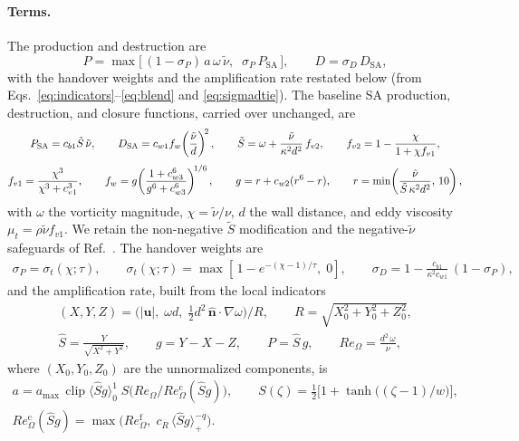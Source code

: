 \documentclass[journal]{new-aiaa}
\begin{document}
\paragraph{Terms.} The production and destruction are
\begin{equation}
  P = \max\!\big[\,(1-\sigma_P)\,a\,\omega\,\tilde\nu,\;\;\sigma_P\,P_\mathrm{SA}\,\big],
  \qquad
  D = \sigma_D\,D_\mathrm{SA},
  \label{eq:aisa_pd}
\end{equation}
with the handover weights and the amplification rate restated below
(from Eqs.~\eqref{eq:indicators}--\eqref{eq:blend} and
\eqref{eq:sigmadtie}). The baseline SA
production, destruction, and closure functions, carried over unchanged, are
\begin{gather}
  P_\mathrm{SA} = c_{b1}\tilde S\,\tilde\nu, \qquad
  D_\mathrm{SA} = c_{w1}f_w\!\left(\frac{\tilde\nu}{d}\right)^{\!2}, \qquad
  \tilde S = \omega + \frac{\tilde\nu}{\kappa^2 d^2}\,f_{v2}, \qquad
  f_{v2} = 1 - \frac{\chi}{1+\chi f_{v1}}, \notag\\[3pt]
  f_{v1} = \frac{\chi^3}{\chi^3+c_{v1}^3}, \qquad
  f_w = g\!\left(\frac{1+c_{w3}^6}{g^6+c_{w3}^6}\right)^{\!1/6}, \qquad
  g = r + c_{w2}(r^6-r), \qquad
  r = \min\!\left(\frac{\tilde\nu}{\tilde S\,\kappa^2 d^2},\,10\right),
  \label{eq:sa_closure}
\end{gather}
with $\omega$ the vorticity magnitude, $\chi\!=\!\tilde\nu/\nu$, $d$ the wall
distance, and eddy viscosity $\mu_t\!=\!\rho\tilde\nu f_{v1}$. We retain the
non-negative $\tilde S$ modification and the negative-$\tilde\nu$ safeguards
of Ref.~\cite{allmaras_2012}. The handover weights are
\begin{gather*}
  \sigma_P = \sigma_t(\chi;\tau), \qquad
  \sigma_t(\chi;\tau) = \max\!\left[\,1-e^{-(\chi-1)/\tau},\;0\right], \qquad
  \sigma_D = 1-\frac{c_{b1}}{\kappa^2c_{w1}}\,(1-\sigma_P),
\end{gather*}
and the amplification rate, built from the local indicators
\begin{gather*}
  (X,Y,Z) = \big(|\mathbf{u}|,\; \omega d,\; \tfrac12 d^{2}\,\hat{\mathbf{n}}\!\cdot\!\nabla\omega\big)\big/R,
  \qquad R = \sqrt{X_0^2+Y_0^2+Z_0^2}, \\[3pt]
  \hat S = \frac{Y}{\sqrt{X^2+Y^2}}, \qquad
  g = Y-X-Z, \qquad P = \hat S\,g, \qquad
  Re_\Omega = \frac{d^2\,\omega}{\nu},
\end{gather*}
where $(X_0,Y_0,Z_0)$ are the unnormalized components, is
\begin{gather*}
  a = a_{\max}\,\operatorname{clip}\langle \hat S g\rangle_0^1\;
      S\!\big(Re_\Omega/Re_\Omega^{\mathrm c}(\hat S g)\big), \qquad
  S(\zeta) = \tfrac12\big[1+\tanh\!\big((\zeta-1)/w\big)\big], \\[3pt]
  Re_\Omega^{\mathrm c}(\hat S g) = \max\!\big(Re_\Omega^{\mathrm f},\; c_R\,\langle \hat S g\rangle_+^{-q}\big).
\end{gather*}
\end{document}
